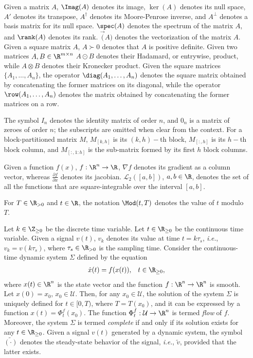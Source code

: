 Given a matrix $A$, $\Imag(A)$ denotes its image, $\ker(A)$ denotes its null space, $A'$ denotes its transpose,  $A^{\dagger}$ denotes its Moore-Penrose inverse, and $A^\perp$ denotes a basis matrix for its null space. $\spec(A)$ denotes the spectrum of the matrix $A$, and $\rank(A)$ denotes its rank. $\vec(A)$ denotes the vectorization of the matrix $A$.
Given a square matrix $A$, $A\succ 0$ denotes that $A$ is positive definite.
Given two matrices $A,B\in\R^{m \times n}$ $A \odot B$ denotes their Hadamard, or entrywise, product, while $A \otimes B$ denotes their Kronecker product.
Given the square matrices $\{A_1,\dotsc,A_n\}$, the operator $\diag(A_1,\dotsc,A_n)$ denotes the square matrix obtained by concatenating the former matrices on its diagonal, while the operator $\row(A_1,\dotsc,A_n)$ denotes the matrix obtained by concatenating the former matrices on a row.

The symbol $I_n$ denotes the identity matrix of order $n$, and $0_n$ is a matrix of zeroes of order $n$; the subscripts are omitted when clear from the context.
For a block-partitioned matrix $M$,	$M_{[k,h]}$ is its $(k,h)-$th block, $M_{[:,h]}$ is its $h-$th block column, and $M_{[:,1:h]}$ is the sub-matrix formed by its first $h$ block columns.

Given a function $f(x)$, $f : \R^n \rightarrow \R$, $\nabla f$ denotes its gradient as a column vector, whereas $\frac{\partial f}{\partial x}$ denotes its jacobian.
$\mathcal{L}_2([a,b])$, $a,b\in\R$, denotes the set of all the functions that are square-integrable over the interval $[a,b]$.

For $T\in\R_{>0}$ and $t\in\R$, the notation $\Mod(t, T)$ denotes the value of $t$ modulo $T$.

Let $k\in\Z_{\geq 0}$ be the discrete time variable.
Let $t\in\R_{\geq 0}$ be the continuous time variable.
Given a signal $v(t)$, $v_k$ denotes its value at time $t=k\tau_s$, \emph{i.e.}, $v_k=v(k\tau_s)$, where $\tau_s\in\R_{>0}$ is the sampling time.
Consider the continuous-time dynamic system $\Sigma$ defined by the equation
\begin{align*}
  \dot{x}(t) &= f(x(t)), & t\in\R_{\geq 0},
\end{align*}
where $x(t)\in\R^n$ is the state vector and the function $f : \R^n \rightarrow \R^n$ is smooth. Let $x(0) = x_0$, $x_0\in\mathcal{U}$. Then, for any $x_0\in\mathcal{U}$, the solution of the system $\Sigma$ is uniquely defined for $t\in[0,T)$, where $T = T(x_0)$, and it can be expressed by a function $x(t) = \Phi_t^f(x_0)$. The function $\Phi_t^f : \mathcal{U} \rightarrow \R^n$ is termed \emph{flow} of $f$. Moreover, the system $\Sigma$ is termed \emph{complete} if and only if its solution exists for any $t\in\R_{\geq 0}$.
Given a signal $v(t)$ generated by a dynamic system, the symbol $\tilde{(\cdot)}$ denotes the steady-state behavior of the signal, \emph{i.e.}, $\tilde{v}$, provided that the latter exists.

